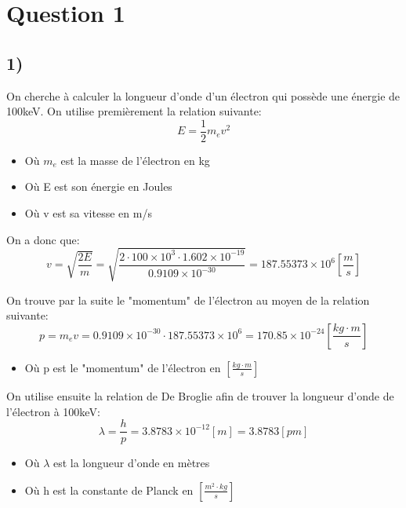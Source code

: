 



\label{s:experimentation}
\chapter{Question 1}
\section{1)}

On cherche à calculer la longueur d'onde d'un électron qui possède une énergie de 100keV. On utilise premièrement la relation suivante:
\begin{equation}
E = \frac{1}{2} m_e v^2
\end{equation}
\begin{itemize}
\item Où $m_e$ est la masse de l'électron en kg
\item Où E est son énergie en Joules
\item Où v est sa vitesse en m/s
\end{itemize}

On a donc que:
\begin{equation}
v = \sqrt{\frac{2E}{m}} = \sqrt{\frac{2 \cdot 100\times 10^{3} \cdot 1.602\times 10^{-19}}{0.9109\times 10^{-30}}} = 187.55373\times 10^{6} \left[\frac{m}{s}\right]
\end{equation}

On trouve par la suite le "momentum" de l'électron au moyen de la relation suivante:
\begin{equation}
p = m_e v = 0.9109\times 10^{-30} \cdot 187.55373\times 10^{6} = 170.85\times 10^{-24} \left[\frac{kg \cdot m}{s}\right]
\end{equation}
\begin{itemize}
\item Où p est le "momentum" de l'électron en $\left[\frac{kg \cdot m}{s}\right]$
\end{itemize}

On utilise ensuite la relation de De Broglie afin de trouver la longueur d'onde de l'électron à 100keV:
\begin{equation}
\lambda = \frac{h}{p} = 3.8783 \times 10^{-12} [m] = 3.8783 [pm]
\end{equation}
\begin{itemize}
\item Où $\lambda$ est la longueur d'onde en mètres
\item Où h est la constante de Planck en $\left[\frac{m^2 \cdot kg}{s}\right]$
\end{itemize}

